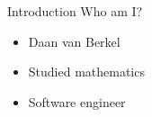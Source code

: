 \begin{frame}{Introduction}
	Who am I?
	\begin{itemize}
		\item Daan van Berkel
		\item Studied mathematics
		\item Software engineer
	\end{itemize}
\end{frame}
